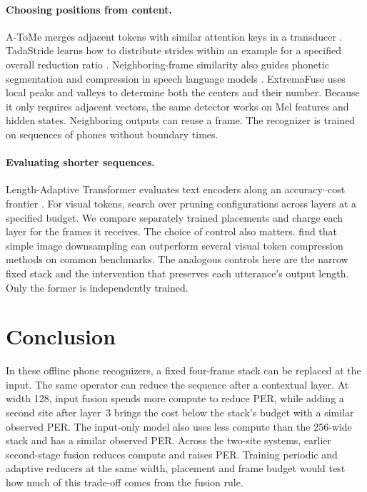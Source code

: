 \documentclass[11pt]{article}
\begin{document}
\paragraph{Choosing positions from content.}
A-ToMe merges adjacent tokens with similar attention keys in a transducer \citep{li23i_interspeech}. TadaStride learns how to distribute strides within an example for a specified overall reduction ratio \citep{lee-jung-2025-tadastride}. Neighboring-frame similarity also guides phonetic segmentation and compression in speech language models \citep{kreuk20_interspeech,yantosca-cheng-2025-phonotomizer,xiang-etal-2026-need}. ExtremaFuse uses local peaks and valleys to determine both the centers and their number. Because it only requires adjacent vectors, the same detector works on Mel features and hidden states. Neighboring outputs can reuse a frame. The recognizer is trained on sequences of phones without boundary times.

\paragraph{Evaluating shorter sequences.}
Length-Adaptive Transformer evaluates text encoders along an accuracy--cost frontier \citep{kim-cho-2021-length}. For visual tokens, \citet{ji-etal-2026-vispco} search over pruning configurations across layers at a specified budget. We compare separately trained placements and charge each layer for the frames it receives. The choice of control also matters. \citet{liao-etal-2026-using} find that simple image downsampling can outperform several visual token compression methods on common benchmarks. The analogous controls here are the narrow fixed stack and the intervention that preserves each utterance's output length. Only the former is independently trained.

\section{Conclusion}
In these offline phone recognizers, a fixed four-frame stack can be replaced at the input. The same operator can reduce the sequence after a contextual layer. At width 128, input fusion spends more compute to reduce PER, while adding a second site after layer~3 brings the cost below the stack's budget with a similar observed PER. The input-only model also uses less compute than the 256-wide stack and has a similar observed PER. Across the two-site systems, earlier second-stage fusion reduces compute and raises PER. Training periodic and adaptive reducers at the same width, placement and frame budget would test how much of this trade-off comes from the fusion rule.
\end{document}
